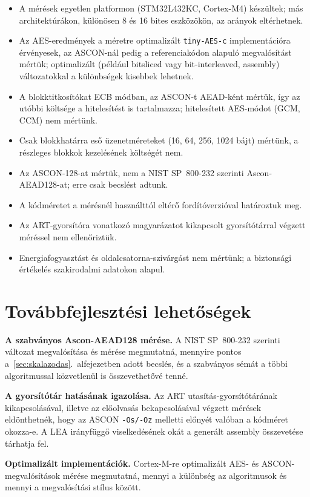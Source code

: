 \documentclass[a4paper,12pt]{report}
\theoremstyle{definition}
\theoremstyle{remark}
\begin{document}
\begin{itemize}
	\item A mérések egyetlen platformon (STM32L432KC, Cortex-M4) készültek; más architektúrákon, különösen 8 és 16 bites eszközökön, az arányok eltérhetnek.
	\item Az AES-eredmények a méretre optimalizált \texttt{tiny-AES-c} implementációra érvényesek, az ASCON-nál pedig a referenciakódon alapuló megvalósítást mértük; optimalizált (például bitsliced vagy bit-interleaved, assembly) változatokkal a különbségek kisebbek lehetnek.
	\item A blokktitkosítókat ECB módban, az ASCON-t AEAD-ként mértük, így az utóbbi költsége a hitelesítést is tartalmazza; hitelesített AES-módot (GCM, CCM) nem mértünk.
	\item Csak blokkhatárra eső üzenetméreteket (16, 64, 256, 1024 bájt) mértünk, a részleges blokkok kezelésének költségét nem.
	\item Az ASCON-128-at mértük, nem a NIST SP~800-232 szerinti Ascon-AEAD128-at; erre csak becslést adtunk.
	\item A kódméretet a mérésnél használttól eltérő fordítóverzióval határoztuk meg.
	\item Az ART-gyorsítóra vonatkozó magyarázatot kikapcsolt gyorsítótárral végzett méréssel nem ellenőriztük.
	\item Energiafogyasztást és oldalcsatorna-szivárgást nem mértünk; a biztonsági értékelés szakirodalmi adatokon alapul.
\end{itemize}

\section{Továbbfejlesztési lehetőségek}\label{sec:tovabbfejlesztes}

\textbf{A szabványos Ascon-AEAD128 mérése.} A NIST SP~800-232 szerinti változat megvalósítása és mérése megmutatná, mennyire pontos a~\ref{sec:skalazodas}.~alfejezetben adott becslés, és a szabványos sémát a többi algoritmussal közvetlenül is összevethetővé tenné.

\textbf{A gyorsítótár hatásának igazolása.} Az ART utasítás-gyorsítótárának kikapcsolásával, illetve az előolvasás bekapcsolásával végzett mérések eldönthetnék, hogy az ASCON \texttt{-Os/-Oz} melletti előnyét valóban a kódméret okozza-e. A LEA irányfüggő viselkedésének okát a generált assembly összevetése tárhatja fel.

\textbf{Optimalizált implementációk.} Cortex-M-re optimalizált AES- és ASCON-megvalósítások mérése megmutatná, mennyi a különbség az algoritmusok és mennyi a megvalósítási stílus között.
\end{document}
